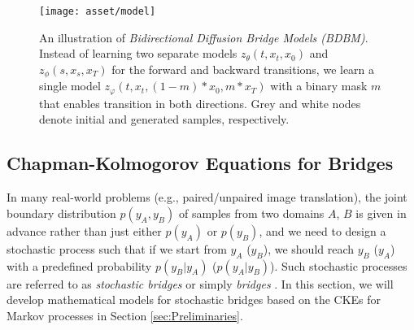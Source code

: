 \noindent 
\begin{figure*}[t]
\begin{centering}
\texttt{[image: asset/model]}
\par\end{centering}
\caption{An illustration of \emph{Bidirectional Diffusion Bridge Models (BDBM)}.
Instead of learning two separate models $z_{\theta}\left(t,x_{t},x_{0}\right)$
and $z_{\phi}\left(s,x_{s},x_{T}\right)$ for the forward and backward
transitions, we learn a single model $z_{\varphi}\left(t,x_{t},\left(1-m\right)*x_{0},m*x_{T}\right)$
with a binary mask $m$ that enables transition in both directions.
Grey and white nodes denote initial and generated samples, respectively.}
\end{figure*}


\subsection{Chapman-Kolmogorov Equations for Bridges\label{subsec:Chapman-Kolmogorov-equations-for-bridges}}

In many real-world problems (e.g., paired/unpaired image translation),
the joint boundary distribution $p\left(y_{A},y_{B}\right)$ of samples
from two domains $A$, $B$ is given in advance rather than just either
$p\left(y_{A}\right)$ or $p\left(y_{B}\right)$, and we need to design
a stochastic process such that if we start from $y_{A}$ ($y_{B}$),
we should reach $y_{B}$ ($y_{A}$) with a predefined probability
$p\left(y_{B}|y_{A}\right)$ ($p\left(y_{A}|y_{B}\right)$). Such
stochastic processes are referred to as \emph{stochastic bridges}
or simply \emph{bridges }\cite{liu2022let,LiuW0l23,LiX0L23,zhou2024denoising}.
In this section, we will develop mathematical models for stochastic
bridges based on the CKEs for Markov processes in Section \ref{sec:Preliminaries}.

